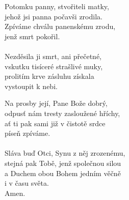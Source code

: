 \begin{translatioMulticol}{2}
Potomku panny, stvořiteli matky,\\
jehož jsi panna počavši zrodila.\\
Zpíváme chválu panenskému zrodu,\\
jenž smrt pokořil.\\
\\
Nezděsila ji smrt, ani přečetné,\\
vskutku tisíceré strašlivé muky,\\
prolitím krve zásluhu získala\\
vystoupit k nebi.\columnbreak

Na prosby její, Pane Bože dobrý,\\
odpusť nám tresty zasloužené hříchy,\\
ať ti pak sami již v čistotě srdce\\
píseň zpíváme.\\
\\
Sláva buď Otci, Synu z něj zrozenému,\\
stejná pak Tobě, jenž společnou silou\\
a Duchem obou Bohem jedním věčně\\
i v času světa.\\
Amen.
\end{translatioMulticol}
